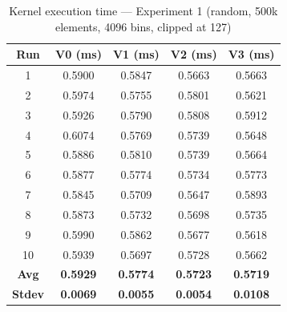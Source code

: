 \documentclass[11pt, letterpaper]{article}
\newcommand{\EOneVZeroOne}{0.5900}
\newcommand{\EOneVZeroTwo}{0.5974}
\newcommand{\EOneVZeroThree}{0.5926}
\newcommand{\EOneVZeroFour}{0.6074}
\newcommand{\EOneVZeroFive}{0.5886}
\newcommand{\EOneVZeroSix}{0.5877}
\newcommand{\EOneVZeroSeven}{0.5845}
\newcommand{\EOneVZeroEight}{0.5873}
\newcommand{\EOneVZeroNine}{0.5990}
\newcommand{\EOneVZeroTen}{0.5939}
\newcommand{\EOneVZeroAvg}{0.5929}
\newcommand{\EOneVZeroStdev}{0.0069}
\newcommand{\EOneVOneOne}{0.5847}
\newcommand{\EOneVOneTwo}{0.5755}
\newcommand{\EOneVOneThree}{0.5790}
\newcommand{\EOneVOneFour}{0.5769}
\newcommand{\EOneVOneFive}{0.5810}
\newcommand{\EOneVOneSix}{0.5774}
\newcommand{\EOneVOneSeven}{0.5709}
\newcommand{\EOneVOneEight}{0.5732}
\newcommand{\EOneVOneNine}{0.5862}
\newcommand{\EOneVOneTen}{0.5697}
\newcommand{\EOneVOneAvg}{0.5774}
\newcommand{\EOneVOneStdev}{0.0055}
\newcommand{\EOneVTwoOne}{0.5663}
\newcommand{\EOneVTwoTwo}{0.5801}
\newcommand{\EOneVTwoThree}{0.5808}
\newcommand{\EOneVTwoFour}{0.5739}
\newcommand{\EOneVTwoFive}{0.5739}
\newcommand{\EOneVTwoSix}{0.5734}
\newcommand{\EOneVTwoSeven}{0.5647}
\newcommand{\EOneVTwoEight}{0.5698}
\newcommand{\EOneVTwoNine}{0.5677}
\newcommand{\EOneVTwoTen}{0.5728}
\newcommand{\EOneVTwoAvg}{0.5723}
\newcommand{\EOneVTwoStdev}{0.0054}
\newcommand{\EOneVThreeOne}{0.5663}
\newcommand{\EOneVThreeTwo}{0.5621}
\newcommand{\EOneVThreeThree}{0.5912}
\newcommand{\EOneVThreeFour}{0.5648}
\newcommand{\EOneVThreeFive}{0.5664}
\newcommand{\EOneVThreeSix}{0.5773}
\newcommand{\EOneVThreeSeven}{0.5893}
\newcommand{\EOneVThreeEight}{0.5735}
\newcommand{\EOneVThreeNine}{0.5618}
\newcommand{\EOneVThreeTen}{0.5662}
\newcommand{\EOneVThreeAvg}{0.5719}
\newcommand{\EOneVThreeStdev}{0.0108}
\begin{document}
\begin{table}[htbp]
\centering
\caption{Kernel execution time — Experiment 1 (random, 500k elements, 4096 bins, clipped at 127)}
\label{tab:exp1}
\begin{tabular}{ccccc}
\toprule
\textbf{Run} &
\textbf{V0 (ms)} &
\textbf{V1 (ms)} &
\textbf{V2 (ms)} &
\textbf{V3 (ms)} \\
\midrule
1  & \EOneVZeroOne   & \EOneVOneOne   & \EOneVTwoOne   & \EOneVThreeOne   \\
2  & \EOneVZeroTwo   & \EOneVOneTwo   & \EOneVTwoTwo   & \EOneVThreeTwo   \\
3  & \EOneVZeroThree & \EOneVOneThree & \EOneVTwoThree & \EOneVThreeThree \\
4  & \EOneVZeroFour  & \EOneVOneFour  & \EOneVTwoFour  & \EOneVThreeFour  \\
5  & \EOneVZeroFive  & \EOneVOneFive  & \EOneVTwoFive  & \EOneVThreeFive  \\
6  & \EOneVZeroSix   & \EOneVOneSix   & \EOneVTwoSix   & \EOneVThreeSix   \\
7  & \EOneVZeroSeven & \EOneVOneSeven & \EOneVTwoSeven & \EOneVThreeSeven \\
8  & \EOneVZeroEight & \EOneVOneEight & \EOneVTwoEight & \EOneVThreeEight \\
9  & \EOneVZeroNine  & \EOneVOneNine  & \EOneVTwoNine  & \EOneVThreeNine  \\
10 & \EOneVZeroTen   & \EOneVOneTen   & \EOneVTwoTen   & \EOneVThreeTen   \\
\midrule
\textbf{Avg}   & \textbf{\EOneVZeroAvg}   & \textbf{\EOneVOneAvg}   & \textbf{\EOneVTwoAvg}   & \textbf{\EOneVThreeAvg}   \\
\textbf{Stdev} & \textbf{\EOneVZeroStdev} & \textbf{\EOneVOneStdev} & \textbf{\EOneVTwoStdev} & \textbf{\EOneVThreeStdev} \\
\bottomrule
\end{tabular}
\end{table}
\end{document}
